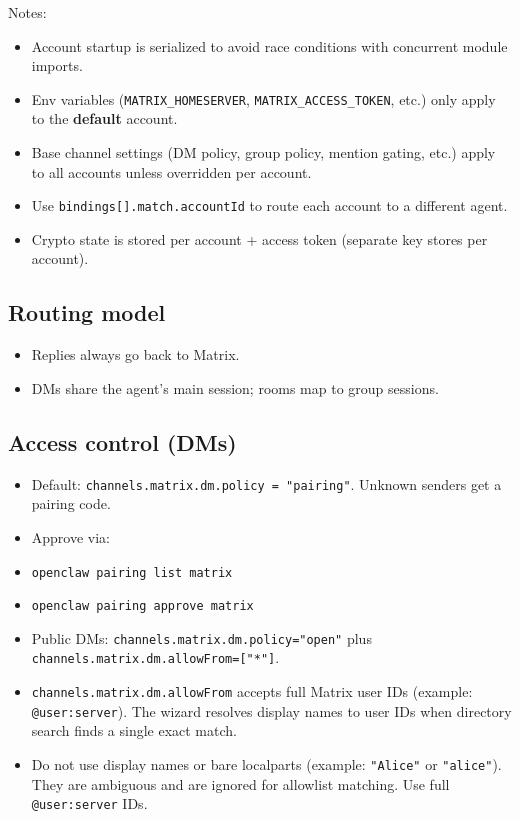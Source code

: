 Notes:

\begin{itemize}
  \item Account startup is serialized to avoid race conditions with concurrent module imports.
  \item Env variables (\texttt{MATRIX\_HOMESERVER}, \texttt{MATRIX\_ACCESS\_TOKEN}, etc.) only apply to the \textbf{default} account.
  \item Base channel settings (DM policy, group policy, mention gating, etc.) apply to all accounts unless overridden per account.
  \item Use \texttt{bindings[].match.accountId} to route each account to a different agent.
  \item Crypto state is stored per account + access token (separate key stores per account).
\end{itemize}


\subsection{Routing model}


\begin{itemize}
  \item Replies always go back to Matrix.
  \item DMs share the agent's main session; rooms map to group sessions.
\end{itemize}


\subsection{Access control (DMs)}


\begin{itemize}
  \item Default: \texttt{channels.matrix.dm.policy = "pairing"}. Unknown senders get a pairing code.
  \item Approve via:
  \item \texttt{openclaw pairing list matrix}
  \item \texttt{openclaw pairing approve matrix }
  \item Public DMs: \texttt{channels.matrix.dm.policy="open"} plus \texttt{channels.matrix.dm.allowFrom=["*"]}.
  \item \texttt{channels.matrix.dm.allowFrom} accepts full Matrix user IDs (example: \texttt{@user:server}). The wizard resolves display names to user IDs when directory search finds a single exact match.
  \item Do not use display names or bare localparts (example: \texttt{"Alice"} or \texttt{"alice"}). They are ambiguous and are ignored for allowlist matching. Use full \texttt{@user:server} IDs.
\end{itemize}



